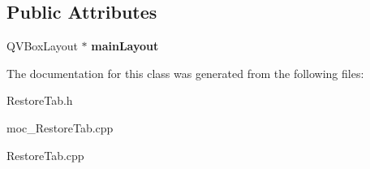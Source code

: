 \subsection*{Public Attributes}
\begin{DoxyCompactItemize}
\item 
\mbox{\label{classRestoreTab_a66ca672d4dc55694dfdfdd7ea3181d04}} 
Q\+V\+Box\+Layout $\ast$ {\bfseries main\+Layout}
\end{DoxyCompactItemize}


The documentation for this class was generated from the following files\+:\begin{DoxyCompactItemize}
\item 
Restore\+Tab.\+h\item 
moc\+\_\+\+Restore\+Tab.\+cpp\item 
Restore\+Tab.\+cpp\end{DoxyCompactItemize}
